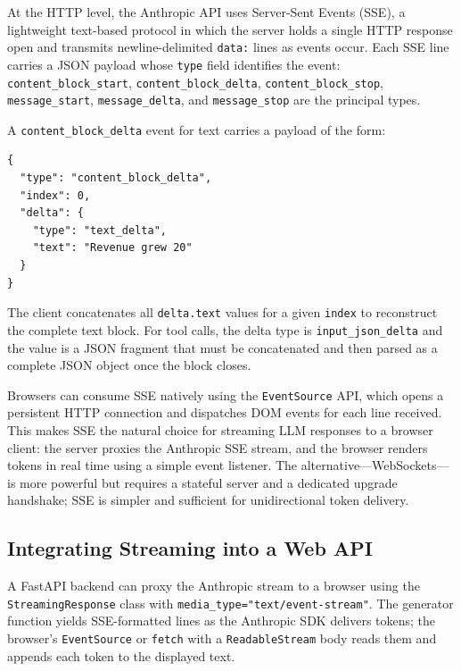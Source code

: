 \begin{deepdive}
At the HTTP level, the Anthropic API uses Server-Sent Events (SSE), a lightweight
text-based protocol in which the server holds a single HTTP response open and
transmits newline-delimited \texttt{data:} lines as events occur. Each SSE line
carries a JSON payload whose \texttt{type} field identifies the event:
\texttt{content\_block\_start}, \texttt{content\_block\_delta},
\texttt{content\_block\_stop}, \texttt{message\_start}, \texttt{message\_delta},
and \texttt{message\_stop} are the principal types.

A \texttt{content\_block\_delta} event for text carries a payload of the form:
\begin{verbatim}
{
  "type": "content_block_delta",
  "index": 0,
  "delta": {
    "type": "text_delta",
    "text": "Revenue grew 20"
  }
}
\end{verbatim}
The client concatenates all \texttt{delta.text} values for a given \texttt{index}
to reconstruct the complete text block. For tool calls, the delta type is
\texttt{input\_json\_delta} and the value is a JSON fragment that must be
concatenated and then parsed as a complete JSON object once the block closes.

Browsers can consume SSE natively using the \texttt{EventSource} API, which opens
a persistent HTTP connection and dispatches DOM events for each line received. This
makes SSE the natural choice for streaming LLM responses to a browser client:
the server proxies the Anthropic SSE stream, and the browser renders tokens in real
time using a simple event listener. The alternative---WebSockets---is more powerful
but requires a stateful server and a dedicated upgrade handshake; SSE is simpler and
sufficient for unidirectional token delivery.
\end{deepdive}

\subsection{Integrating Streaming into a Web API}
\label{app:sdk-commercial:streaming:web}

A FastAPI backend can proxy the Anthropic stream to a browser using the
\texttt{StreamingResponse} class with \texttt{media\_type="text/event-stream"}. The
generator function yields SSE-formatted lines as the Anthropic SDK delivers tokens;
the browser's \texttt{EventSource} or \texttt{fetch} with a \texttt{ReadableStream}
body reads them and appends each token to the displayed text.

